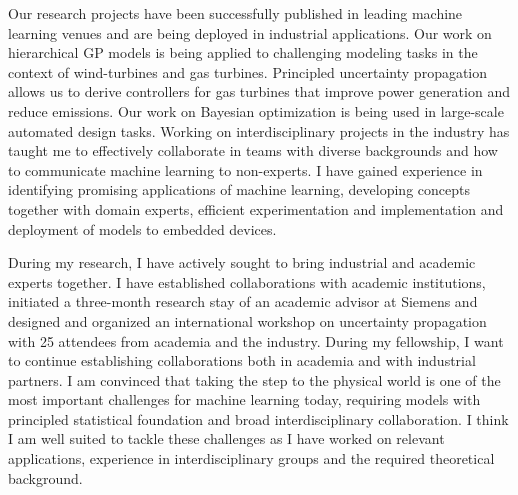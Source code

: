 Our research projects have been successfully published in leading machine learning venues and are being deployed in industrial applications.
Our work on hierarchical GP models is being applied to challenging modeling tasks in the context of wind-turbines and gas turbines.
Principled uncertainty propagation allows us to derive controllers for gas turbines that improve power generation and reduce emissions.
Our work on Bayesian optimization is being used in large-scale automated design tasks.
Working on interdisciplinary projects in the industry has taught me to effectively collaborate in teams with diverse backgrounds and how to communicate machine learning to non-experts.
I have gained experience in identifying promising applications of machine learning, developing concepts together with domain experts, efficient experimentation and implementation and deployment of models to embedded devices.

During my research, I have actively sought to bring industrial and academic experts together.
I have established collaborations with academic institutions, initiated a three-month research stay of an academic advisor at Siemens and designed and organized an international workshop on uncertainty propagation with 25 attendees from academia and the industry.
During my fellowship, I want to continue establishing collaborations both in academia and with industrial partners.
I am convinced that taking the step to the physical world is one of the most important challenges for machine learning today, requiring models with principled statistical foundation and broad interdisciplinary collaboration.
I think I am well suited to tackle these challenges as I have worked on relevant applications, experience in interdisciplinary groups and the required theoretical background.
